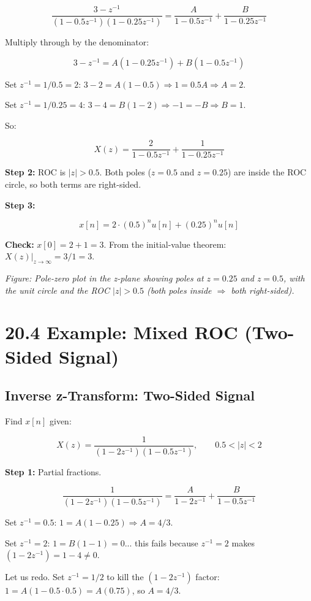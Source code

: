 \documentclass[11pt]{article}
\begin{document}
\[\frac{3 - z^{-1}}{(1 - 0.5 z^{-1})(1 - 0.25 z^{-1})} = \frac{A}{1 - 0.5 z^{-1}} + \frac{B}{1 - 0.25 z^{-1}}\]

Multiply through by the denominator:

\[3 - z^{-1} = A(1 - 0.25 z^{-1}) + B(1 - 0.5 z^{-1})\]

Set $z^{-1} = 1/0.5 = 2$: $3 - 2 = A(1 - 0.5) \Rightarrow 1 = 0.5 A \Rightarrow A = 2$.

Set $z^{-1} = 1/0.25 = 4$: $3 - 4 = B(1 - 2) \Rightarrow -1 = -B \Rightarrow B = 1$.

So:

\[X(z) = \frac{2}{1 - 0.5 z^{-1}} + \frac{1}{1 - 0.25 z^{-1}}\]

\textbf{Step 2:} ROC is $|z| > 0.5$. Both poles ($z = 0.5$ and $z = 0.25$) are inside the ROC circle, so both terms are right-sided.

\textbf{Step 3:}

\[x[n] = 2 \cdot (0.5)^n u[n] + (0.25)^n u[n]\]

\textbf{Check:} $x[0] = 2 + 1 = 3$. From the initial-value theorem: $X(z)|_{z \to \infty} = 3/1 = 3$. \checkmark

\textit{Figure: Pole-zero plot in the z-plane showing poles at $z = 0.25$ and $z = 0.5$, with the unit circle and the ROC $|z| > 0.5$ (both poles inside $\Rightarrow$ both right-sided).}

\section*{20.4 Example: Mixed ROC (Two-Sided Signal)}

\subsection*{Inverse z-Transform: Two-Sided Signal}

Find $x[n]$ given:

\[X(z) = \frac{1}{(1 - 2 z^{-1})(1 - 0.5 z^{-1})}, \qquad 0.5 < |z| < 2\]

\textbf{Step 1:} Partial fractions.

\[\frac{1}{(1 - 2 z^{-1})(1 - 0.5 z^{-1})} = \frac{A}{1 - 2 z^{-1}} + \frac{B}{1 - 0.5 z^{-1}}\]

Set $z^{-1} = 0.5$: $1 = A(1 - 0.25) \Rightarrow A = 4/3$.

Set $z^{-1} = 2$: $1 = B(1 - 1) = 0$... this fails because $z^{-1} = 2$ makes $(1 - 2 z^{-1}) = 1 - 4 \neq 0$.

Let us redo. Set $z^{-1} = 1/2$ to kill the $(1 - 2 z^{-1})$ factor: $1 = A(1 - 0.5 \cdot 0.5) = A(0.75)$, so $A = 4/3$.
\end{document}

